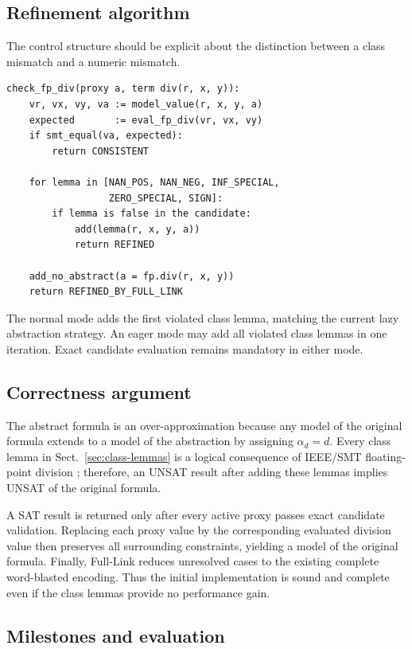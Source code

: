 \documentclass[runningheads]{llncs}
\newcommand{\proxy}{\alpha_d}
\begin{document}
\subsection{Refinement algorithm}

The control structure should be explicit about the distinction between a
class mismatch and a numeric mismatch.

\begin{lstlisting}[style=plan,caption={Class-first checking for one abstracted FP division.}]
check_fp_div(proxy a, term div(r, x, y)):
    vr, vx, vy, va := model_value(r, x, y, a)
    expected       := eval_fp_div(vr, vx, vy)
    if smt_equal(va, expected):
        return CONSISTENT

    for lemma in [NAN_POS, NAN_NEG, INF_SPECIAL,
                  ZERO_SPECIAL, SIGN]:
        if lemma is false in the candidate:
            add(lemma(r, x, y, a))
            return REFINED

    add_no_abstract(a = fp.div(r, x, y))
    return REFINED_BY_FULL_LINK
\end{lstlisting}

The normal mode adds the first violated class lemma, matching the current lazy
abstraction strategy.  An eager mode may add all violated class lemmas in one
iteration.  Exact candidate evaluation remains mandatory in either mode.

\subsection{Correctness argument}

The abstract formula is an over-approximation because any model of the
original formula extends to a model of the abstraction by assigning
\(\proxy=d\).  Every class lemma in Sect.~\ref{sec:class-lemmas} is a logical
consequence of IEEE/SMT floating-point division \cite{IEEE754}; therefore, an
UNSAT result after adding these lemmas implies UNSAT of the original formula.

A SAT result is returned only after every active proxy passes exact candidate
validation.  Replacing each proxy value by the corresponding evaluated
division value then preserves all surrounding constraints, yielding a model
of the original formula.  Finally, Full-Link reduces unresolved cases to the
existing complete word-blasted encoding.  Thus the initial implementation is
sound and complete even if the class lemmas provide no performance gain.

\subsection{Milestones and evaluation}
\end{document}
